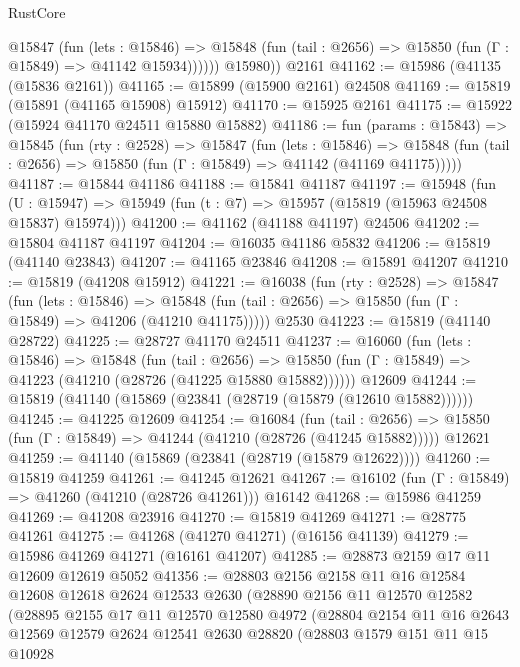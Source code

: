 \begin{lexlean}{RustCore}
\begin{coremodule}
            @15847
              (fun (lets : @15846) =>
              @15848 (fun (tail : @2656) => @15850 (fun (Γ : @15849) => @41142 @15934))))))
        @15980))
    @2161
@41162 := @15986 (@41135 (@15836 @2161))
@41165 := @15899 (@15900 @2161) @24508
@41169 := @15819 (@15891 (@41165 @15908) @15912)
@41170 := @15925 @2161
@41175 := @15922 (@15924 @41170 @24511 @15880 @15882)
@41186 := fun (params : @15843) =>
  @15845
    (fun (rty : @2528) =>
    @15847
      (fun (lets : @15846) =>
      @15848 (fun (tail : @2656) => @15850 (fun (Γ : @15849) => @41142 (@41169 @41175)))))
@41187 := @15844 @41186
@41188 := @15841 @41187
@41197 := @15948
    (fun (U : @15947) => @15949 (fun (t : @7) => @15957 (@15819 (@15963 @24508 @15837) @15974)))
@41200 := @41162 (@41188 @41197) @24506
@41202 := @15804 @41187 @41197
@41204 := @16035 @41186 @5832
@41206 := @15819 (@41140 @23843)
@41207 := @41165 @23846
@41208 := @15891 @41207
@41210 := @15819 (@41208 @15912)
@41221 := @16038
    (fun (rty : @2528) =>
    @15847
      (fun (lets : @15846) =>
      @15848 (fun (tail : @2656) => @15850 (fun (Γ : @15849) => @41206 (@41210 @41175)))))
    @2530
@41223 := @15819 (@41140 @28722)
@41225 := @28727 @41170 @24511
@41237 := @16060
    (fun (lets : @15846) =>
    @15848
      (fun (tail : @2656) =>
      @15850 (fun (Γ : @15849) => @41223 (@41210 (@28726 (@41225 @15880 @15882))))))
    @12609
@41244 := @15819 (@41140 (@15869 (@23841 (@28719 (@15879 (@12610 @15882))))))
@41245 := @41225 @12609
@41254 := @16084
    (fun (tail : @2656) => @15850 (fun (Γ : @15849) => @41244 (@41210 (@28726 (@41245 @15882)))))
    @12621
@41259 := @41140 (@15869 (@23841 (@28719 (@15879 @12622))))
@41260 := @15819 @41259
@41261 := @41245 @12621
@41267 := @16102 (fun (Γ : @15849) => @41260 (@41210 (@28726 @41261))) @16142
@41268 := @15986 @41259
@41269 := @41208 @23916
@41270 := @15819 @41269
@41271 := @28775 @41261
@41275 := @41268 (@41270 @41271) (@16156 @41139)
@41279 := @15986 @41269 @41271 (@16161 @41207)
@41285 := @28873 @2159 @17 @11 @12609 @12619 @5052
@41356 := @28803
    @2156
    @2158
    @11
    @16
    @12584
    @12608
    @12618
    @2624
    @12533
    @2630
    (@28890
      @2156
      @11
      @12570
      @12582
      (@28895
        @2155
        @17
        @11
        @12570
        @12580
        @4972
        (@28804
          @2154
          @11
          @16
          @2643
          @12569
          @12579
          @2624
          @12541
          @2630
          @28820
          (@28803
            @1579
            @151
            @11
            @15
            @10928

\end{coremodule}
\end{lexlean}
